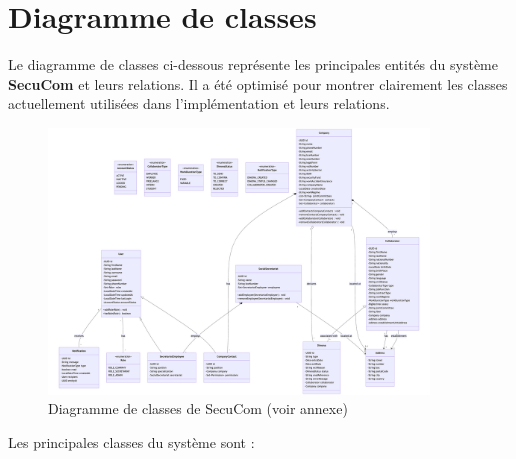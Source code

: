 \section{Diagramme de classes}

\noindent Le diagramme de classes ci-dessous représente les principales entités du système \textbf{SecuCom} et leurs relations. Il a été optimisé pour montrer clairement les classes actuellement utilisées dans l'implémentation et leurs relations.

\begin{figure}[H]
\centering
\includegraphics[width=0.9\textwidth]{ClassDiagram.png}
\caption{Diagramme de classes de SecuCom (voir annexe)}
\end{figure}

\vspace{0.5cm}

\noindent Les principales classes du système sont :

